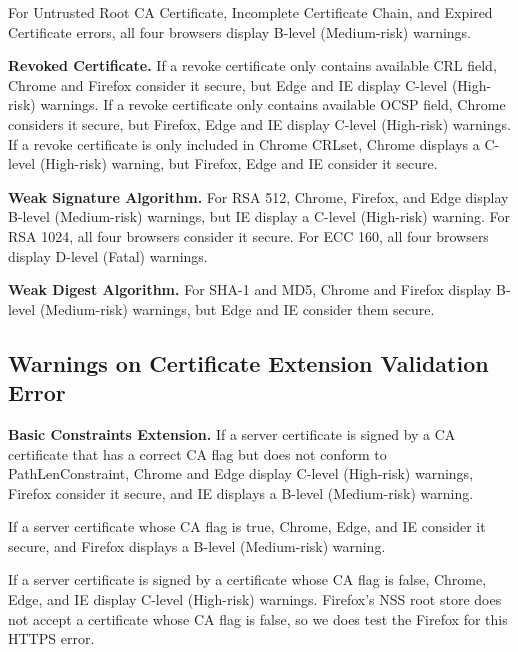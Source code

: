     For Untrusted Root CA Certificate, Incomplete Certificate Chain, and Expired Certificate errors,
        all four browsers display B-level (Medium-risk) warnings.

\textbf{Revoked Certificate.}
    If a revoke certificate only contains available CRL field,
        Chrome and Firefox consider it secure,
            but Edge and IE display C-level (High-risk) warnings.
    If a revoke certificate only contains available OCSP field,
        Chrome considers it secure, but Firefox,
            Edge and IE display C-level (High-risk) warnings.
    If a revoke certificate is only included in Chrome CRLset,
        Chrome displays a C-level (High-risk) warning,
            but Firefox, Edge and IE consider it secure.

\textbf{Weak Signature Algorithm.}
    For RSA 512,
        Chrome, Firefox, and Edge display B-level (Medium-risk) warnings,
            but IE display a C-level (High-risk) warning.
    For RSA 1024,
        all four browsers consider it secure.
    For ECC 160,
        all four browsers display D-level (Fatal) warnings.

\textbf{Weak Digest Algorithm.}
    For SHA-1 and MD5,
        Chrome and Firefox display B-level (Medium-risk) warnings,
            but Edge and IE consider them secure.

\subsection{Warnings on Certificate Extension Validation Error}

\textbf{Basic Constraints Extension.}
    If a server certificate is signed by a CA certificate that has a correct CA flag but does not conform to PathLenConstraint,
    Chrome and Edge display C-level (High-risk) warnings,
    Firefox consider it secure, and IE displays a B-level (Medium-risk) warning.

    If a server certificate whose CA flag is true,
    Chrome, Edge, and IE consider it secure,
    and Firefox displays a B-level (Medium-risk) warning.

    If a server certificate is signed by a certificate whose CA flag is false,
     Chrome, Edge, and IE display C-level (High-risk) warnings.
     Firefox's NSS root store does not accept a certificate whose CA flag is false, so we does test the Firefox for this HTTPS error.


